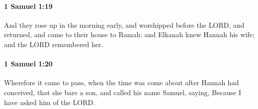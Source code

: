 		\paragraph{1 Samuel 1:19} %
			\label{1SAMUEL-1-19}

			And they rose up in the morning early, and worshipped before the LORD, and returned, and came to their house to Ramah: and Elkanah knew Hannah his wife; and the LORD remembered her.


		\paragraph{1 Samuel 1:20} %
			\label{1SAMUEL-1-20}

			Wherefore it came to pass, when the time was come about after Hannah had conceived, that she bare a son, and called his name Samuel, saying, Because I have asked him of the LORD.


